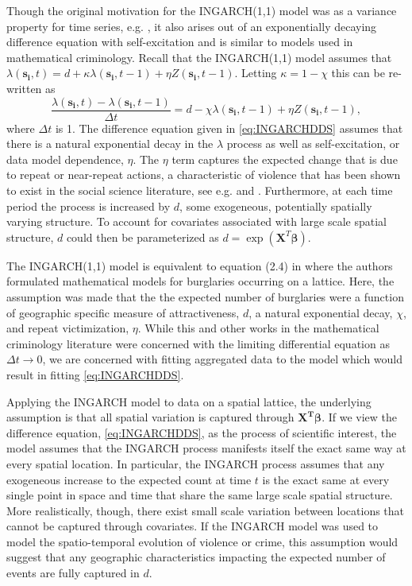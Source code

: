 \documentclass[11pt]{isuthesis}
\begin{document}
Though the original motivation for the INGARCH(1,1) model was as a variance property for time series, e.g. \cite{ferland2006integer}, it also arises out of an exponentially decaying difference equation with self-excitation and is similar to models used in mathematical criminology.  Recall that the INGARCH(1,1) model assumes that $\lambda(\boldsymbol{s_i},t)=d+\kappa \lambda(\boldsymbol{s_i},t-1)+\eta Z(\boldsymbol{s_i},t-1)$.  Letting $\kappa=1-\chi$ this can be re-written as
\begin{equation}
	\frac{\lambda(\boldsymbol{s_i},t)-\lambda(\boldsymbol{s_i},t-1)}{\Delta t}=d-\chi \lambda(\boldsymbol{s_i},t-1)+\eta Z(\boldsymbol{s_i},t-1), \label{eq:INGARCHDDS}
\end{equation}
where $\Delta t$ is 1.  The difference equation given in \eqref{eq:INGARCHDDS} assumes that there is a natural exponential decay in the $\lambda$ process as well as self-excitation, or data model dependence, $\eta$.  The $\eta$ term captures the expected change  that is due to repeat or near-repeat actions, a characteristic of violence that has been shown to exist in the social science literature, see e.g. \cite{polvi1990repeat} and \cite{pease1998repeat}.  Furthermore, at each time period the process is increased by $d$, some exogeneous, potentially spatially varying structure.  To account for covariates associated with large scale spatial structure, $d$ could then be parameterized as $d=\exp(\boldsymbol{X}^T \boldsymbol{\beta})$.

The INGARCH(1,1) model is equivalent to equation (2.4) in \cite{short2008statistical} where the authors formulated mathematical models for burglaries occurring on a lattice.  Here, the assumption was made that the the expected number of burglaries were a function of geographic specific measure of attractiveness, $d$, a natural exponential decay, $\chi$, and repeat victimization, $\eta$.  While this and other works in the mathematical criminology literature were concerned with the limiting differential equation as $\Delta t \to 0$, we are concerned with fitting aggregated data to the model which would result in fitting \eqref{eq:INGARCHDDS}.

Applying the INGARCH model to data on a spatial lattice, the underlying assumption is that all spatial variation is captured through $\boldsymbol{X^T}\boldsymbol{\beta}$. If we view the difference equation, \eqref{eq:INGARCHDDS}, as the process of scientific interest, the model assumes that the INGARCH process manifests itself the exact same way at every spatial location.  In particular, the INGARCH process assumes that any exogeneous increase to the expected count at time $t$ is the exact same at every single point in space and time that share the same large scale spatial structure.   More realistically, though, there exist small scale variation between locations that cannot be captured through covariates.  If the INGARCH model was used to model the spatio-temporal evolution of violence or crime, this assumption would suggest that any geographic characteristics impacting the expected number of events are fully captured in $d$.
\end{document}
